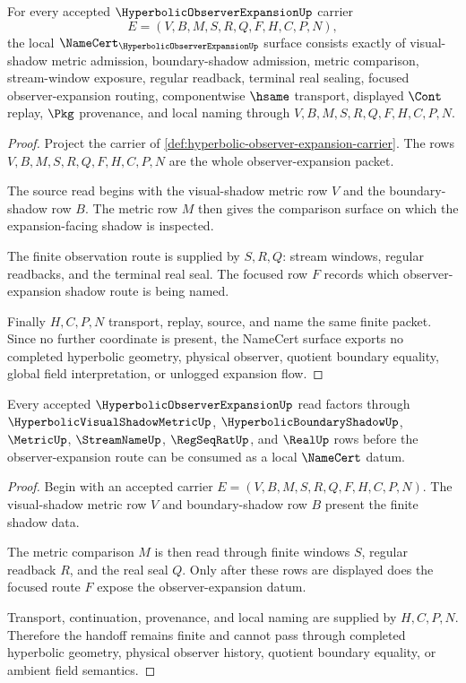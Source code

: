 \begin{theorem}
\label{thm:hyperbolic-observer-expansion-namecert-obligations}
For every accepted $\HyperbolicObserverExpansionUp$ carrier
$$
E=(V,B,M,S,R,Q,F,H,C,P,N),
$$
the local $\NameCert_{\HyperbolicObserverExpansionUp}$ surface consists exactly of visual-shadow metric admission, boundary-shadow admission, metric comparison, stream-window exposure, regular readback, terminal real sealing, focused observer-expansion routing, componentwise $\hsame$ transport, displayed $\Cont$ replay, $\Pkg$ provenance, and local naming through $V,B,M,S,R,Q,F,H,C,P,N$.
\end{theorem}
\begin{proof}
Project the carrier of \autoref{def:hyperbolic-observer-expansion-carrier}. The rows $V,B,M,S,R,Q,F,H,C,P,N$ are the whole observer-expansion packet.

The source read begins with the visual-shadow metric row $V$ and the boundary-shadow row $B$. The metric row $M$ then gives the comparison surface on which the expansion-facing shadow is inspected.

The finite observation route is supplied by $S,R,Q$: stream windows, regular readbacks, and the terminal real seal. The focused row $F$ records which observer-expansion shadow route is being named.

Finally $H,C,P,N$ transport, replay, source, and name the same finite packet. Since no further coordinate is present, the NameCert surface exports no completed hyperbolic geometry, physical observer, quotient boundary equality, global field interpretation, or unlogged expansion flow.
\end{proof}

\begin{theorem}
\label{thm:hyperbolic-observer-expansion-finite-shadow-handoff}
Every accepted $\HyperbolicObserverExpansionUp$ read factors through $\HyperbolicVisualShadowMetricUp$, $\HyperbolicBoundaryShadowUp$, $\MetricUp$, $\StreamNameUp$, $\RegSeqRatUp$, and $\RealUp$ rows before the observer-expansion route can be consumed as a local $\NameCert$ datum.
\end{theorem}
\begin{proof}
Begin with an accepted carrier $E=(V,B,M,S,R,Q,F,H,C,P,N)$. The visual-shadow metric row $V$ and boundary-shadow row $B$ present the finite shadow data.

The metric comparison $M$ is then read through finite windows $S$, regular readback $R$, and the real seal $Q$. Only after these rows are displayed does the focused route $F$ expose the observer-expansion datum.

Transport, continuation, provenance, and local naming are supplied by $H,C,P,N$. Therefore the handoff remains finite and cannot pass through completed hyperbolic geometry, physical observer history, quotient boundary equality, or ambient field semantics.
\end{proof}

